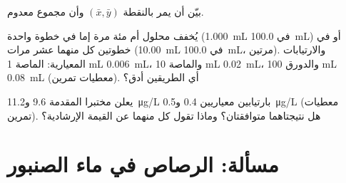 \begin{exercise}[$\star\star\star$]\label{exo:b2:measurement-statistics:10}
بيّن أن  يمر بالنقطة $(\bar x, \bar y)$ وأن مجموع  معدوم.
\end{exercise}

\begin{exercise}[$\star\star\star$]\label{exo:b2:measurement-statistics:11}
يُخفف محلول أم مئة مرة إما في خطوة واحدة (\qty{1.000}{mL} في \qty{100.0}{mL}) أو
في خطوتين كل منهما عشر مرات (\qty{10.00}{mL} في \qty{100.0}{mL}، مرتين). والارتيابات المعيارية: الماصة 1 mL
\qty{0.006}{mL}، والماصة 10 mL \qty{0.02}{mL}، والدورق 100 mL \qty{0.08}{mL} (معطيات تمرين).
أي الطريقين أدق؟
\end{exercise}

\begin{exercise}[$\star\star\star$]\label{exo:b2:measurement-statistics:12}
يعلن مختبرا المقدمة 9.6 و\qty{11.2}{\micro g/L} بارتيابين معياريين
0.4 و\qty{0.5}{\micro g/L} (معطيات تمرين). هل نتيجتاهما متوافقتان؟ وماذا تقول كل منهما عن
القيمة الإرشادية؟
\end{exercise}

\section{مسألة: الرصاص في ماء الصنبور}


